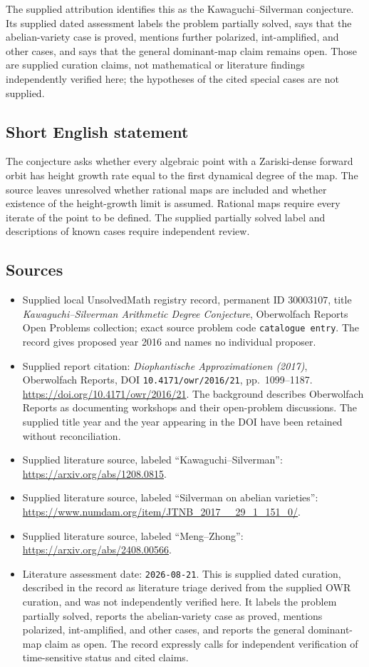 \documentclass[11pt]{article}
\begin{document}
The supplied attribution identifies this as the Kawaguchi--Silverman conjecture. Its supplied dated assessment labels the problem partially solved, says that the abelian-variety case is proved, mentions further polarized, int-amplified, and other cases, and says that the general dominant-map claim remains open. Those are supplied curation claims, not mathematical or literature findings independently verified here; the hypotheses of the cited special cases are not supplied.
\subsection{Short English statement}
The conjecture asks whether every algebraic point with a Zariski-dense forward orbit has height growth rate equal to the first dynamical degree of the map. The source leaves unresolved whether rational maps are included and whether existence of the height-growth limit is assumed. Rational maps require every iterate of the point to be defined. The supplied partially solved label and descriptions of known cases require independent review.
\subsection{Sources}
\begin{itemize}
\item Supplied local UnsolvedMath registry record, permanent ID \(30003107\), title \emph{Kawaguchi--Silverman Arithmetic Degree Conjecture}, Oberwolfach Reports Open Problems collection; exact source problem code \texttt{catalogue entry}. The record gives proposed year 2016 and names no individual proposer.
\item Supplied report citation: \emph{Diophantische Approximationen (2017)}, Oberwolfach Reports, DOI \texttt{10.4171/owr/2016/21}, pp.\ 1099--1187. \url{https://doi.org/10.4171/owr/2016/21}. The background describes Oberwolfach Reports as documenting workshops and their open-problem discussions. The supplied title year and the year appearing in the DOI have been retained without reconciliation.
\item Supplied literature source, labeled ``Kawaguchi--Silverman'': \url{https://arxiv.org/abs/1208.0815}.
\item Supplied literature source, labeled ``Silverman on abelian varieties'': \url{https://www.numdam.org/item/JTNB_2017__29_1_151_0/}.
\item Supplied literature source, labeled ``Meng--Zhong'': \url{https://arxiv.org/abs/2408.00566}.
\item Literature assessment date: \texttt{2026-08-21}. This is supplied dated curation, described in the record as literature triage derived from the supplied OWR curation, and was not independently verified here. It labels the problem partially solved, reports the abelian-variety case as proved, mentions polarized, int-amplified, and other cases, and reports the general dominant-map claim as open. The record expressly calls for independent verification of time-sensitive status and cited claims.
\end{itemize}
\end{document}
